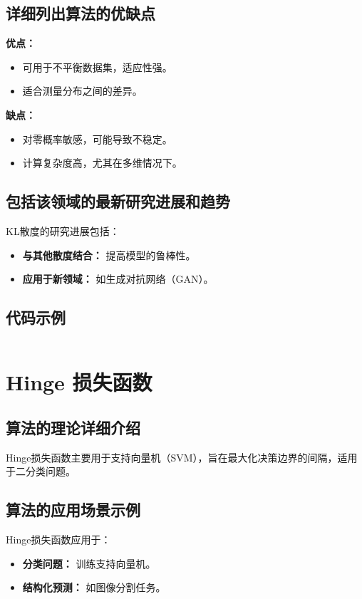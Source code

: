 \subsection*{详细列出算法的优缺点}
\textbf{优点：}
\begin{itemize}
    \item 可用于不平衡数据集，适应性强。
    \item 适合测量分布之间的差异。
\end{itemize}

\textbf{缺点：}
\begin{itemize}
    \item 对零概率敏感，可能导致不稳定。
    \item 计算复杂度高，尤其在多维情况下。
\end{itemize}

\subsection*{包括该领域的最新研究进展和趋势}
KL散度的研究进展包括：
\begin{itemize}
    \item \textbf{与其他散度结合：} 提高模型的鲁棒性。
    \item \textbf{应用于新领域：} 如生成对抗网络（GAN）。
\end{itemize}
\subsection*{代码示例}
\begin{lstlisting}

\end{lstlisting}


\section{Hinge 损失函数}
\subsection*{算法的理论详细介绍}
Hinge损失函数主要用于支持向量机（SVM），旨在最大化决策边界的间隔，适用于二分类问题。

\subsection*{算法的应用场景示例}
Hinge损失函数应用于：
\begin{itemize}
    \item \textbf{分类问题：} 训练支持向量机。
    \item \textbf{结构化预测：} 如图像分割任务。
\end{itemize}

